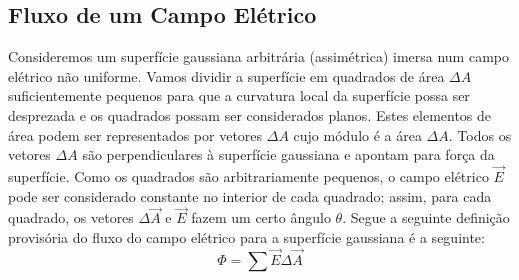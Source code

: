 \documentclass{article}
\begin{document}
\subsection{Fluxo de um Campo Elétrico}
Consideremos um superfície gaussiana arbitrária (assimétrica) imersa num campo elétrico não uniforme. Vamos dividir a superfície em quadrados de área \(\Delta A\) suficientemente pequenos para que a curvatura local da superfície possa ser desprezada e os quadrados possam ser considerados planos. Estes elementos de área podem ser representados por vetores \(\Delta A\) cujo módulo é a área \(\Delta A\). Todos os vetores \(\Delta A\) são perpendiculares à superfície gaussiana e apontam para força da superfície.
Como os quadrados são arbitrariamente pequenos, o campo elétrico \(\vec{E}\) pode ser considerado constante no interior de cada quadrado; assim, para cada quadrado, os vetores \(\Delta \vec{A}\) e \(\vec{E}\) fazem um certo ângulo \(\theta\).
Segue a seguinte definição provisória do fluxo do campo elétrico para a superfície gaussiana é a seguinte:
\[\Phi = \sum{\vec{E}{\Delta \vec{A}}}\]
\end{document}

